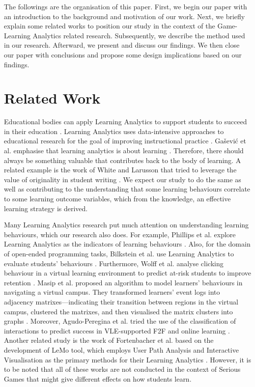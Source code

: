 \documentclass[conference]{IEEEtran}
\begin{document}
The followings are the organisation of this paper. First, we begin our paper with an introduction to the background and motivation of our work. Next, we briefly explain some related works to position our study in the context of the Game-Learning Analytics related research. Subsequently, we describe the method used in our research. Afterward, we present and discuss our findings. We then close our paper with conclusions and propose some design implications based on our findings.

\section{Related Work}
\label{sec:related_work}

Educational bodies can apply Learning Analytics to support students to succeed in their education \cite{dietz2013using}. Learning Analytics uses data-intensive approaches to educational research for the goal of improving instructional practice \cite{Baker2014}. Gašević et al. emphasise that learning analytics is about learning \cite{gasevic2015let}. Therefore, there should always be something valuable that contributes back to the body of learning. A related example is the work of White and Larusson that tried to leverage the value of originality in student writing \cite{White2014}. We expect our study to do the same as well as contributing to the understanding that some learning behaviours correlate to some learning outcome variables, which from the knowledge, an effective learning strategy is derived.

Many Learning Analytics research put much attention on understanding learning behaviours, which our research also does. For example, Phillips et al. explore Learning Analytics as the indicators of learning behaviours \cite{PhilMaorPres2012rq}. Also, for the domain of open-ended programming tasks, Bilkstein et al. use Learning Analytics to evaluate students’ behaviours \cite{blikstein2011analytics}. Furthermore, Wolff et al. analyse clicking behaviour in a virtual learning environment to predict at-risk students to improve retention \cite{wolff2013retention}. Masip et al. proposed an algorithm to model learners’ behaviours in navigating a virtual campus. They transformed learners’ event logs into adjacency matrixes—indicating their transition between regions in the virtual campus, clustered the matrixes, and then visualised the matrix clusters into graphs \cite{masip2011capturing}. Moreover, Agudo-Peregina et al. tried the use of the classification of interactions to predict success in VLE-supported F2F and online learning \cite{AGUDOPEREGRINA2014542}. Another related study is the work of Fortenbacher et al. based on the development of LeMo tool, which employs User Path Analysis and Interactive Visualisation as the primary methods for their Learning Analytics \cite{fortenbacher2013lemo}. However, it is to be noted that all of these works are not conducted in the context of Serious Games that might give different effects on how students learn. 
\end{document}
